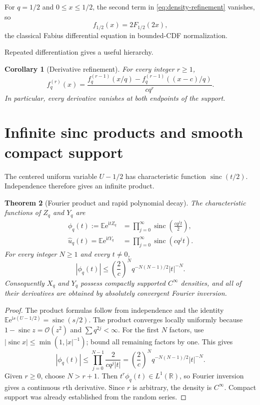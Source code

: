 \documentclass[11pt,oneside]{article}
\newtheorem{theorem}{Theorem}[section]
\newtheorem{corollary}[theorem]{Corollary}
\theoremstyle{definition}
\theoremstyle{remark}
\newcommand{\R}{\mathbb R}
\newcommand{\E}{\mathbb E}
\newcommand{\sinc}{\operatorname{sinc}}
\newcommand{\e}{\mathrm e}
\newcommand{\ii}{\mathrm i}
\newcommand{\bigO}{\mathcal O}
\begin{document}
For $q=1/2$ and $0\le x\le1/2$, the second term in
\eqref{eq:density-refinement} vanishes, so
\[
 f_{1/2}(x)=2F_{1/2}(2x),
\]
the classical Fabius differential equation in bounded-CDF normalization.

Repeated differentiation gives a useful hierarchy.

\begin{corollary}[Derivative refinement]
\label{cor:derivative-refinement}
For every integer $r\ge1$,
\begin{equation}
 f_q^{(r)}(x)
 =\frac{f_q^{(r-1)}(x/q)-f_q^{(r-1)}((x-c)/q)}{c q^r}.         \label{eq:derivative-refinement}
\end{equation}
In particular, every derivative vanishes at both endpoints of the support.
\end{corollary}

\section{Infinite sinc products and smooth compact support}
\label{sec:fourier}

The centered uniform variable $U-1/2$ has characteristic function
$\sinc(t/2)$.  Independence therefore gives an infinite product.

\begin{theorem}[Fourier product and rapid polynomial decay]
\label{thm:smoothness}
The characteristic functions of $Z_q$ and $Y_q$ are
\begin{align}
 \phi_q(t):=\E\e^{\ii tZ_q}
 &=\prod_{j=0}^{\infty}\sinc\!\left(\frac{cq^jt}{2}\right),  \label{eq:phi-z}\\
 \widehat u_q(t)=\E\e^{\ii tY_q}
 &=\prod_{j=0}^{\infty}\sinc(cq^jt).                         \label{eq:phi-y}
\end{align}
For every integer $N\ge1$ and every $t\ne0$,
\begin{equation}
 |\phi_q(t)|
 \le \left(\frac{2}{c}\right)^N q^{-N(N-1)/2}|t|^{-N}.      \label{eq:rapid-bound}
\end{equation}
Consequently $X_q$ and $Y_q$ possess compactly supported $C^\infty$ densities, and all
of their derivatives are obtained by absolutely convergent Fourier inversion.
\end{theorem}

\begin{proof}
The product formulas follow from independence and the identity
\(
 \E\e^{\ii s(U-1/2)}=\sinc(s/2).
\)
The product converges locally uniformly because
$1-\sinc z=\bigO(z^2)$ and $\sum q^{2j}<\infty$.
For the first $N$ factors, use $|\sinc x|\le\min(1,|x|^{-1})$; bound all remaining factors by
one.  This gives
\[
 |\phi_q(t)|
 \le\prod_{j=0}^{N-1}\frac{2}{cq^j|t|}
 =\left(\frac{2}{c}\right)^Nq^{-N(N-1)/2}|t|^{-N}.
\]
Given $r\ge0$, choose $N>r+1$.  Then $t^r\phi_q(t)\in L^1(\R)$, so Fourier inversion gives a
continuous $r$th derivative.  Since $r$ is arbitrary, the density is $C^\infty$.  Compact
support was already established from the random series.
\end{proof}
\end{document}
